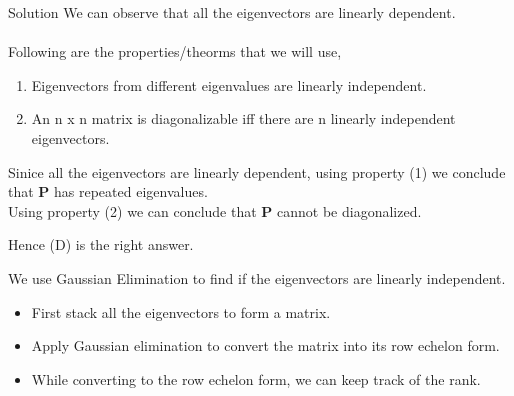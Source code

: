 \documentclass{beamer}
\begin{document}
\begin{frame}{Solution}
We can observe that all the eigenvectors are linearly dependent.
\\
\\
Following are the properties/theorms that we will use,
\begin{enumerate}
    \item Eigenvectors from different eigenvalues are linearly independent.
    \item An n x n matrix is diagonalizable iff there are n linearly independent eigenvectors.
\end{enumerate}

Sinice all the eigenvectors are linearly dependent, using property (1) we conclude that \textbf{P} has repeated eigenvalues. \\
Using property (2) we can conclude that \textbf{P} cannot be diagonalized.

Hence (D) is the right answer.

\end{frame}
\begin{frame}

We use Gaussian Elimination to find if the eigenvectors are linearly independent.
\begin{itemize}
    \item First stack all the eigenvectors to form a matrix.
    \item Apply Gaussian elimination to convert the matrix into its row echelon form.
    \item While converting to the row echelon form, we can keep track of the rank.
\end{itemize}
\end{frame}
\end{document}
